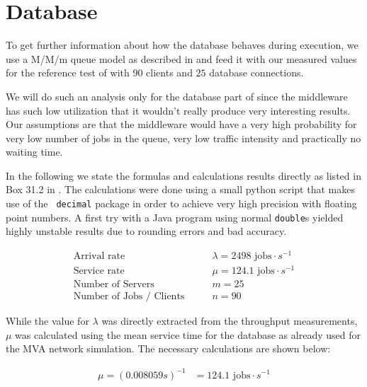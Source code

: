 \documentclass[a4paper, oneside]{csthesis}
\begin{document}
    
    

\section{Database}
    To get further information about how the database behaves during execution,
    we use a M/M/m queue model as described in \cite{jain2008art} and feed it
    with our measured values for the reference test of \telesto{} with $90$
    clients and $25$ database connections.
    
    We will do such an analysis only for the database part of \telesto{} since
    the middleware has such low utilization that it wouldn't really produce very
    interesting results. Our assumptions are that the middleware would have a
    very high probability for very low number of jobs in the queue, very low
    traffic intensity and practically no waiting time.

    In the following we state the formulas and calculations results directly as
    listed in Box 31.2 in \cite{jain2008art}. The calculations were done
    using a small python script that makes use of the {\tt
    decimal} package in order to achieve very high precision with floating point numbers. A first try with a Java program using normal {\tt double}s yielded highly unstable results due to rounding errors and bad accuracy.

    \begin{align*}
        \text{Arrival rate}  & \qquad \lambda = 2498 \text{ jobs}\cdot s^{-1} \\
        \text{Service rate}  & \qquad \mu = 124.1 \text{ jobs} \cdot s^{-1} \\
        \text{Number of Servers}        & \qquad m       = 25   \\
        \text{Number of Jobs / Clients} & \qquad n       = 90
    \end{align*}

    While the value for $\lambda$ was directly extracted from the throughput
    measurements, $\mu$ was calculated using the mean service time for the
    database as already used for the MVA network simulation. The necessary
    calculations are shown below:

    \begin{align*}
        \mu = (0.008059s)^{-1} &= 124.1 \text{ jobs} \cdot s^{-1} \\
    \end{align*}
    
\end{document}
